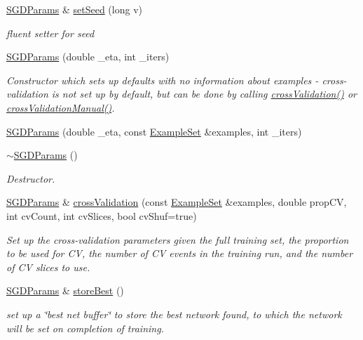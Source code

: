 \begin{DoxyCompactItemize}
\hyperlink{structNet_1_1SGDParams}{S\+G\+D\+Params} \& \hyperlink{structNet_1_1SGDParams_aaa6dc6375f537218c24124a099877011}{set\+Seed} (long v)
\begin{DoxyCompactList}\small\item\em fluent setter for seed \end{DoxyCompactList}\item 
\hyperlink{structNet_1_1SGDParams_a54c15623be2b308f0bb012039ed55a66}{S\+G\+D\+Params} (double \+\_\+eta, int \+\_\+iters)
\begin{DoxyCompactList}\small\item\em Constructor which sets up defaults with no information about examples -\/ cross-\/validation is not set up by default, but can be done by calling \hyperlink{structNet_1_1SGDParams_a1e613f79f5f6e86acd5cc4b5d306d314}{cross\+Validation()} or \hyperlink{structNet_1_1SGDParams_a12b0553a033fdfcdb966ec47279f98eb}{cross\+Validation\+Manual()}. \end{DoxyCompactList}\item 
\hyperlink{structNet_1_1SGDParams_a50ddf804d1214087ca428d19fa3a5a67}{S\+G\+D\+Params} (double \+\_\+eta, const \hyperlink{classExampleSet}{Example\+Set} \&examples, int \+\_\+iters)
\item 
\hyperlink{structNet_1_1SGDParams_afcb9a8760902fad34d0f5fd59974bbf5}{$\sim$\+S\+G\+D\+Params} ()
\begin{DoxyCompactList}\small\item\em Destructor. \end{DoxyCompactList}\item 
\hyperlink{structNet_1_1SGDParams}{S\+G\+D\+Params} \& \hyperlink{structNet_1_1SGDParams_a1e613f79f5f6e86acd5cc4b5d306d314}{cross\+Validation} (const \hyperlink{classExampleSet}{Example\+Set} \&examples, double prop\+CV, int cv\+Count, int cv\+Slices, bool cv\+Shuf=true)
\begin{DoxyCompactList}\small\item\em Set up the cross-\/validation parameters given the full training set, the proportion to be used for CV, the number of CV events in the training run, and the number of CV slices to use. \end{DoxyCompactList}\item 
\hyperlink{structNet_1_1SGDParams}{S\+G\+D\+Params} \& \hyperlink{structNet_1_1SGDParams_a471378bcdc9310b7b03f3245649939ce}{store\+Best} ()
\begin{DoxyCompactList}\small\item\em set up a \char`\"{}best net buffer\char`\"{} to store the best network found, to which the network will be set on completion of training. \end{DoxyCompactList}\end{DoxyCompactItemize}
